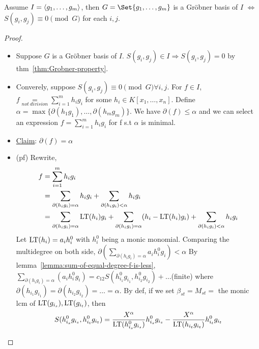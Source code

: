 \begin{theorem}
  Assume $I = \langle g_1, \dots, g_m \rangle$, then
  $G = \Set{g_1, \dots, g_m}$ is a Gr\"{o}bner basis of $I$ $\iff$
  $S(g_i, g_j) \equiv 0 \pmod{G}$ for each $i, j$.
  \begin{proof} \mbox{}
    \begin{itemize}
      \item Suppose $G$ is a Gr\"{o}bner basis of $I$.
        $S(g_i, g_j) \in I \Rightarrow S(g_i, g_j) = 0$
        by thm~\ref{thm:Grobner-property}.
      \item Converely, suppose $S(g_i, g_j) \equiv 0 \pmod G \forall i, j$.
        For $f \in I$, $f \underset{not\ division}{=}
        \sum\limits_{i=1}^m h_ig_i$ for some $h_i \in K[x_1,\dots,x_n]$.
        Define $\alpha = \max\{\partial(h_1g_1),\dots,\partial(h_mg_m)\}$.
        We have $\partial(f) \leq \alpha$ and we can select an expression
        $f = \sum\limits_{i=1}^m h_ig_i$ for f s.t $\alpha$ is minimal.
      \item \uline{Claim}: $\partial(f) = \alpha$
      \item (pf) Rewrite,
        \[
          \begin{split}f &= \sum_{i = 1}^m h_ig_i \\
            &= \sum_{\partial(h_ig_i) = \alpha} h_ig_i
              + \sum_{\partial(h_ig_i) < \alpha} h_ig_i \\
            &= \sum_{\partial(h_ig_i) = \alpha} \operatorname{LT}(h_i)g_i
              + \sum_{\partial(h_ig_i) = \alpha} (h_i-\operatorname{LT}(h_i)g_i)
              + \sum_{\partial(h_ig_i) < \alpha} h_ig_i
          \end{split}
        \]
          Let $\operatorname{LT}(h_i) = a_ih_i^0$ with $h_i^0$ being a monic monomial.
          Comparing the multidegree on both side,
          $\partial\left(\sum\limits_{\partial(h_ig_i) = \alpha} a_ih_i^0g_i\right)
          < \alpha$ By lemma~\ref{lemma:sum-of-equal-degree-f-is-less},
          $\underset{\partial(h_ig_i) = \alpha}{\sum}\left(a_ih_i^0g_i\right) = c_{12}S(h_{i_1}^0g_{i_1},h_{i_2}^0g_{i_2}) + \dots$(finite) where $\partial(h_{i_1}g_{i_1}) = \partial(h_{i_2}g_{i_2}) = \dots = \alpha $. By def, if we set $\beta_{st} = M_{st} =$ the monic lcm of $\operatorname{LT}(g_{i_s}), \operatorname{LT}(g_{i_t})$, then
          \[
            \begin{split}
              S(h_{i_s}^0g_{i_s}, h_{i_t}^0g_{i_t}) &= \frac{X^\alpha}{\LT(h_{i_s}^0g_{i_s})}h_{i_s}^0g_{i_s} - \frac{X^\alpha}{\LT(h_{i_t}g_{i_t})}h_{i_t}^0g_{i_t} \\

\end{split}\]
\end{itemize}
\end{proof}
\end{theorem}
